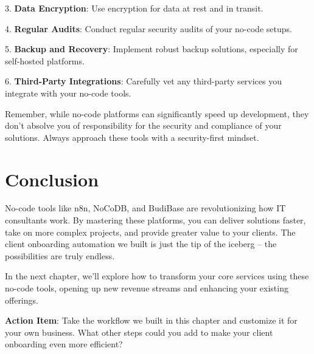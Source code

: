 3. \textbf{Data Encryption}: Use encryption for data at rest and in transit.

4. \textbf{Regular Audits}: Conduct regular security audits of your no-code setups.

5. \textbf{Backup and Recovery}: Implement robust backup solutions, especially for self-hosted platforms.

6. \textbf{Third-Party Integrations}: Carefully vet any third-party services you integrate with your no-code tools.

Remember, while no-code platforms can significantly speed up development, they don't absolve you of responsibility for the security and compliance of your solutions. Always approach these tools with a security-first mindset.

\section{Conclusion}

No-code tools like n8n, NoCoDB, and BudiBase are revolutionizing how IT consultants work. By mastering these platforms, you can deliver solutions faster, take on more complex projects, and provide greater value to your clients. The client onboarding automation we built is just the tip of the iceberg – the possibilities are truly endless.

In the next chapter, we'll explore how to transform your core services using these no-code tools, opening up new revenue streams and enhancing your existing offerings.

\textbf{Action Item}: Take the workflow we built in this chapter and customize it for your own business. What other steps could you add to make your client onboarding even more efficient?